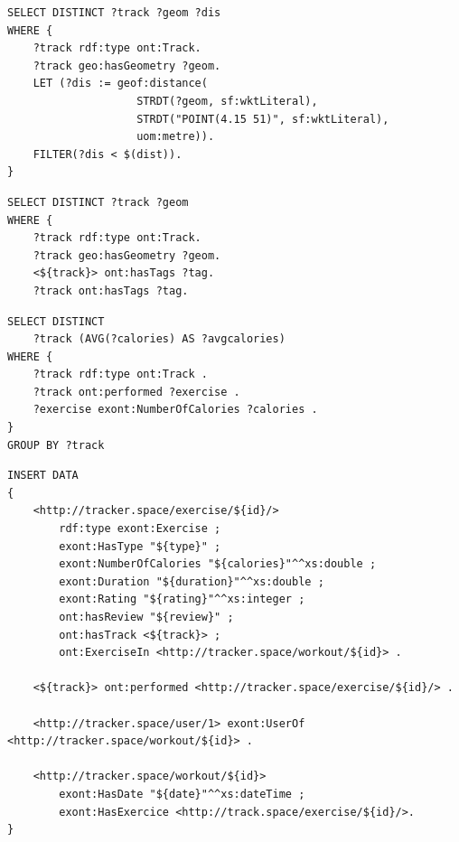\documentclass[11pt,a4paper]{scrreprt}
\begin{document}
\begin{lstlisting}[caption={Query for tracks within a specified distance of a point }, label = query:tracksdistance ]
SELECT DISTINCT ?track ?geom ?dis
WHERE {
    ?track rdf:type ont:Track.
    ?track geo:hasGeometry ?geom.
    LET (?dis := geof:distance( 
    				STRDT(?geom, sf:wktLiteral), 
    				STRDT("POINT(4.15 51)", sf:wktLiteral),
    				uom:metre)).
    FILTER(?dis < $(dist)).
}
\end{lstlisting}

\begin{lstlisting}[caption={Query for tracks with a tag common with a specified track }, label = query:trackstags ]
SELECT DISTINCT ?track ?geom
WHERE {
    ?track rdf:type ont:Track.
    ?track geo:hasGeometry ?geom.
    <${track}> ont:hasTags ?tag.
    ?track ont:hasTags ?tag.
\end{lstlisting}

\begin{lstlisting}[caption={Query for average calories burnt per track}, label=query:trackscalories]
SELECT DISTINCT
    ?track (AVG(?calories) AS ?avgcalories)
WHERE {
    ?track rdf:type ont:Track .
    ?track ont:performed ?exercise .
    ?exercise exont:NumberOfCalories ?calories .
}
GROUP BY ?track
\end{lstlisting}

\begin{lstlisting}[caption={Query to add an exercise to a track}, label=query:exercicesadd]
INSERT DATA
{
    <http://tracker.space/exercise/${id}/>
        rdf:type exont:Exercise ;
        exont:HasType "${type}" ;
        exont:NumberOfCalories "${calories}"^^xs:double ;
        exont:Duration "${duration}"^^xs:double ;
        exont:Rating "${rating}"^^xs:integer ;
        ont:hasReview "${review}" ;
        ont:hasTrack <${track}> ;
        ont:ExerciseIn <http://tracker.space/workout/${id}> .

    <${track}> ont:performed <http://tracker.space/exercise/${id}/> .

    <http://tracker.space/user/1> exont:UserOf <http://tracker.space/workout/${id}> .

    <http://tracker.space/workout/${id}> 
        exont:HasDate "${date}"^^xs:dateTime ;
        exont:HasExercice <http://track.space/exercise/${id}/>.
}
\end{lstlisting}
\end{document}
